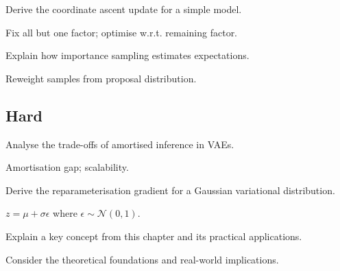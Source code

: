 \begin{exercisebox}[medium]
\begin{problem}
Derive the coordinate ascent update for a simple model.
\end{problem}
\begin{hintbox}
Fix all but one factor; optimise w.r.t. remaining factor.
\end{hintbox}
\end{exercisebox}


\begin{exercisebox}[medium]
\begin{problem}
Explain how importance sampling estimates expectations.
\end{problem}
\begin{hintbox}
Reweight samples from proposal distribution.
\end{hintbox}
\end{exercisebox}


\subsection*{Hard}

\begin{exercisebox}[hard]
\begin{problem}
Analyse the trade-offs of amortised inference in VAEs.
\end{problem}
\begin{hintbox}
Amortisation gap; scalability.
\end{hintbox}
\end{exercisebox}


\begin{exercisebox}[hard]
\begin{problem}
Derive the reparameterisation gradient for a Gaussian variational distribution.
\end{problem}
\begin{hintbox}
$z = \mu + \sigma \epsilon$ where $\epsilon \sim \mathcal{N}(0,1)$.
\end{hintbox}
\end{exercisebox}



\begin{exercisebox}[hard]
\begin{problem}
Explain a key concept from this chapter and its practical applications.
\end{problem}
\begin{hintbox}
Consider the theoretical foundations and real-world implications.
\end{hintbox}
\end{exercisebox}


